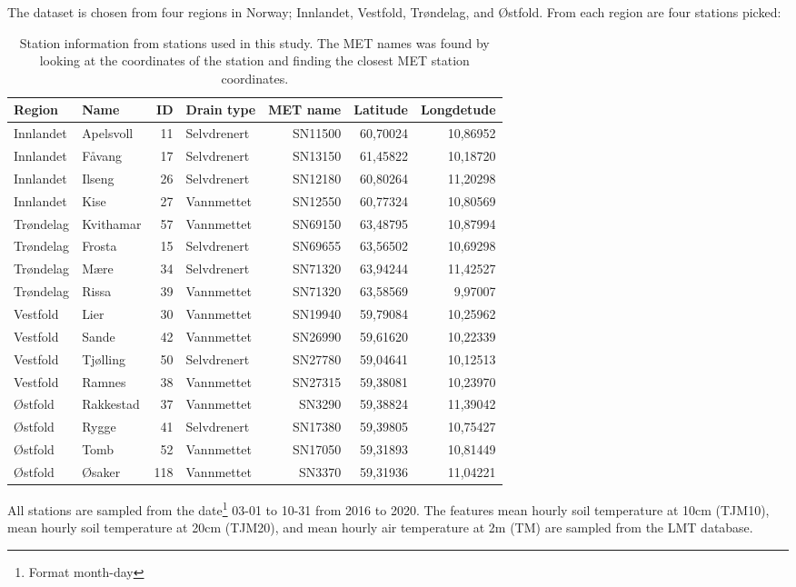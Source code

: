 The dataset is chosen from four regions in Norway; Innlandet, Vestfold, Trøndelag, and Østfold. From each region are four stations picked:
\begin{table}[h]
	\begin{adjustwidth}{-1in}{-1in}
		\centering
		\begin{tabular}{llrlrrr}
			\hline Region&Name&ID&Drain type&MET name& Latitude&Longdetude\\\hline
			Innlandet&Apelsvoll&11& Selvdrenert&SN11500&60,70024&10,86952\\
			Innlandet& Fåvang&17& Selvdrenert&SN13150&61,45822&10,18720\\
			Innlandet& Ilseng&26& Selvdrenert&SN12180&60,80264&11,20298\\
			Innlandet& Kise&27& Vannmettet&SN12550&60,77324&10,80569\\
			Trøndelag& Kvithamar&57& Vannmettet&SN69150&63,48795&10,87994\\
			Trøndelag& Frosta&15& Selvdrenert&SN69655&63,56502&10,69298\\
			Trøndelag& Mære&34& Selvdrenert&SN71320&63,94244&11,42527\\
			Trøndelag& Rissa&39& Vannmettet&SN71320&63,58569&9,97007\\
			Vestfold& Lier&30& Vannmettet&SN19940&59,79084&10,25962\\
			Vestfold& Sande&42& Vannmettet&SN26990&59,61620&10,22339\\
			Vestfold& Tjølling&50& Selvdrenert&SN27780&59,04641&10,12513\\
			Vestfold& Ramnes&38& Vannmettet&SN27315&59,38081&10,23970\\
			Østfold& Rakkestad&37& Vannmettet&SN3290&59,38824&11,39042\\
			Østfold& Rygge&41& Selvdrenert&SN17380&59,39805&10,75427\\
			Østfold& Tomb&52& Vannmettet&SN17050&59,31893&10,81449\\
			Østfold& Øsaker&118& Vannmettet&SN3370&59,31936&11,04221\\\hline
		\end{tabular}
	\end{adjustwidth}
	\caption[Soil information for each station/w location and MET-ID]{Station information from stations used in this study. The MET names was found by looking at the coordinates of the station and finding the closest MET station coordinates.}
\end{table}

All stations are sampled from the date\footnote{Format month-day} 03-01 to 10-31 from 2016 to 2020. The features mean hourly soil temperature at 10cm (TJM10), mean hourly soil temperature at 20cm (TJM20), and mean hourly air temperature at 2m (TM) are sampled from the LMT database.

